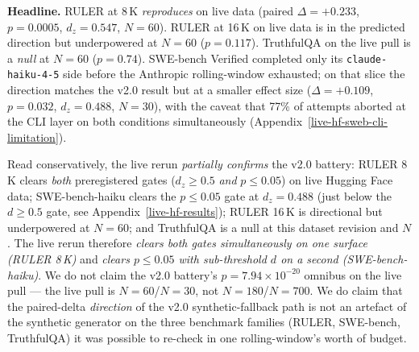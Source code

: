 \textbf{Headline.} RULER at 8\,K \emph{reproduces} on live data (paired $\Delta=+0.233$, $p=0.0005$, $d_z=0.547$, $N=60$). RULER at 16\,K on live data is in the predicted direction but underpowered at $N=60$ ($p=0.117$). TruthfulQA on the live pull is a \emph{null} at $N=60$ ($p=0.74$). SWE-bench Verified completed only its \passthrough{\lstinline!claude-haiku-4-5!} side before the Anthropic rolling-window exhausted; on that slice the direction matches the v2.0 result but at a smaller effect size ($\Delta=+0.109$, $p=0.032$, $d_z=0.488$, $N=30$), with the caveat that 77\% of attempts aborted at the CLI layer on both conditions simultaneously (Appendix~\ref{live-hf-sweb-cli-limitation}).

Read conservatively, the live rerun \emph{partially confirms} the v2.0 battery: RULER 8\,K clears \emph{both} preregistered gates ($d_z \ge 0.5$ \emph{and} $p \le 0.05$) on live Hugging Face data; SWE-bench-haiku clears the $p \le 0.05$ gate at $d_z=0.488$ (just below the $d \ge 0.5$ gate, see Appendix~\ref{live-hf-results}); RULER 16\,K is directional but underpowered at $N=60$; and TruthfulQA is a null at this dataset revision and $N$. The live rerun therefore \emph{clears both gates simultaneously on one surface (RULER 8\,K)} and \emph{clears $p \le 0.05$ with sub-threshold $d$ on a second (SWE-bench-haiku)}. We do not claim the v2.0 battery's $p = 7.94 \times 10^{-20}$ omnibus on the live pull --- the live pull is $N=60$/$N=30$, not $N=180$/$N=700$. We do claim that the paired-delta \emph{direction} of the v2.0 synthetic-fallback path is not an artefact of the synthetic generator on the three benchmark families (RULER, SWE-bench, TruthfulQA) it was possible to re-check in one rolling-window's worth of budget.

